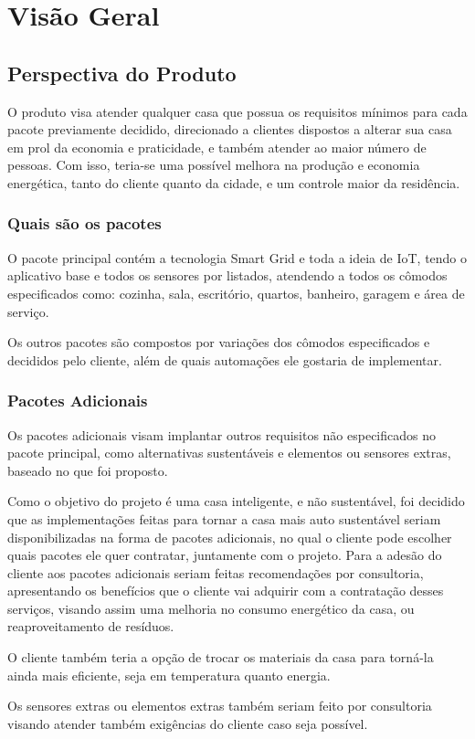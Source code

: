 \chapter{Visão Geral}
\label{visaogeral}
    \section{Perspectiva do Produto}
        \par O produto visa atender qualquer casa que possua os requisitos mínimos para cada pacote previamente decidido, direcionado a clientes dispostos a alterar sua casa em prol da economia e praticidade, e também atender ao maior número de pessoas. Com isso, teria-se uma  possível melhora na produção e economia energética, tanto do cliente quanto da cidade, e um controle maior da residência.

        \subsection{Quais são os pacotes}
            \par O pacote principal contém a tecnologia Smart Grid e toda a ideia de IoT, tendo o aplicativo base e todos os sensores por listados, atendendo a todos os cômodos especificados como: cozinha, sala, escritório, quartos, banheiro, garagem e área de serviço.
	        \par Os outros pacotes são compostos por variações dos cômodos especificados e decididos pelo cliente, além de quais automações ele gostaria de implementar.

        \subsection{Pacotes Adicionais}
            \par Os pacotes adicionais visam implantar outros requisitos não especificados no pacote principal, como alternativas sustentáveis e elementos ou sensores extras, baseado no que foi proposto.
	        \par Como o objetivo do projeto é uma casa inteligente, e não sustentável, foi decidido que as implementações feitas para tornar a casa mais auto sustentável seriam disponibilizadas na forma de pacotes adicionais, no qual o cliente pode escolher quais pacotes ele quer contratar, juntamente com o projeto. Para a adesão do cliente aos pacotes adicionais seriam feitas recomendações por consultoria, apresentando os benefícios que o cliente vai adquirir com a contratação desses serviços, visando assim uma melhoria no consumo energético da casa, ou reaproveitamento de resíduos.
            \par O cliente também teria a opção de trocar os materiais da casa para torná-la ainda mais eficiente, seja em temperatura quanto energia.
            \par Os sensores extras ou elementos extras também seriam feito por consultoria visando atender também exigências do cliente caso seja possível.

